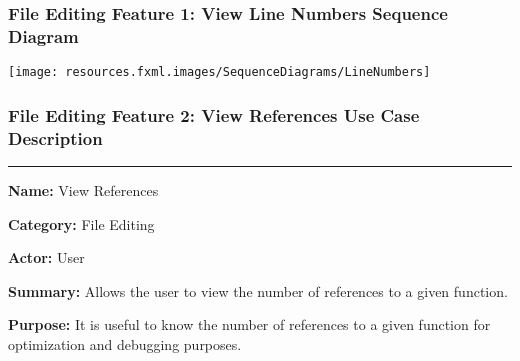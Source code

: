 \documentclass[twoside,letterpaper]{article}
\begin{document}
\subsubsection[File Editing Feature 1: View Line Numbers Sequence Diagram]{\rmfamily\bfseries\color{black}
	File Editing Feature 1: View Line Numbers Sequence Diagram}
\hypertarget{RefHeading22059017292}{}

\bigskip

\texttt{[image: resources.fxml.images/SequenceDiagrams/LineNumbers]}

\newpage

\subsubsection[File Editing Feature 2: View References]{\rmfamily\bfseries\color{black}
	File Editing Feature 2: View References Use Case Description}
\hypertarget{RefHeading22059017292}{}

\vspace{2pt}
\hrule
\vspace{8pt}
	\noindent\textbf{Name:} View References \newline
	
	\noindent\textbf{Category:} File Editing \newline
	
	\noindent\textbf{Actor:} User \newline
	
	\noindent\textbf{Summary:} Allows the user to view the number of references to a given function. \newline
	
	\noindent\textbf{Purpose:} It is useful to know the number of references to a given function for optimization and debugging purposes. \newline
	
\end{document}
